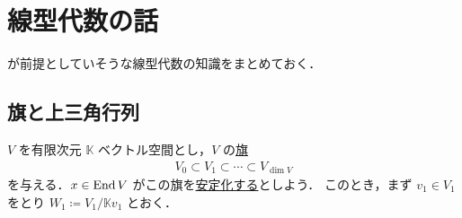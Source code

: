 \documentclass[rep_main]{subfiles}
\begin{document}
\chapter{線型代数の話}

\cite{Humphreys1972introduction}が前提としていそうな線型代数の知識をまとめておく．

\section{旗と上三角行列}

$V$ を有限次元 $\mathbb{K}$ ベクトル空間とし，$V$ の\hyperref[def:flag]{旗}
\begin{align}
    V_0 \subset V_1 \subset \cdots \subset V_{\dim V}
\end{align}
を与える．$x \in \operatorname{End} V$ がこの旗を\hyperref[def:flag]{安定化する}としよう．
このとき，まず $v_1 \in V_1$ をとり $W_1 \coloneqq V_1 / \mathbb{K} v_1$ とおく．
\end{document}
